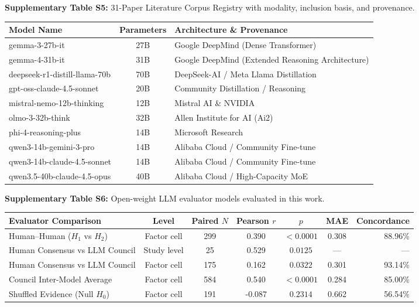 \documentclass[12pt]{article}
\begin{document}
\endgroup
\vspace{0.4em}

\noindent\textbf{Supplementary Table S5:} 31-Paper Literature Corpus Registry with modality, inclusion basis, and provenance.

\newpage

\begingroup
\small
\noindent\begin{tabularx}{\textwidth}{@{}l c >{\raggedright\arraybackslash}X@{}}
\toprule
\textbf{Model Name} & \textbf{Parameters} & \textbf{Architecture \& Provenance} \\
\midrule
gemma-3-27b-it & 27B & Google DeepMind (Dense Transformer) \\
gemma-4-31b-it & 31B & Google DeepMind (Extended Reasoning Architecture) \\
deepseek-r1-distill-llama-70b & 70B & DeepSeek-AI / Meta Llama Distillation \\
gpt-oss-claude-4.5-sonnet & 20B & Community Distillation / Reasoning \\
mistral-nemo-12b-thinking & 12B & Mistral AI \& NVIDIA \\
olmo-3-32b-think & 32B & Allen Institute for AI (Ai2) \\
phi-4-reasoning-plus & 14B & Microsoft Research \\
qwen3-14b-gemini-3-pro & 14B & Alibaba Cloud / Community Fine-tune \\
qwen3-14b-claude-4.5-sonnet & 14B & Alibaba Cloud / Community Fine-tune \\
qwen3.5-40b-claude-4.5-opus & 40B & Alibaba Cloud / High-Capacity MoE \\
\bottomrule
\end{tabularx}
\endgroup
\vspace{0.4em}

\noindent\textbf{Supplementary Table S6:} Open-weight LLM evaluator models evaluated in this work.

\vspace{1.5em}

\begingroup
\small
\setlength{\tabcolsep}{3.5pt}
\begin{center}
\begin{tabular}{@{}l c c c c c r@{}}
\toprule
\textbf{Evaluator Comparison} & \textbf{Level} & \textbf{Paired $N$} & \textbf{Pearson $r$} & \textbf{$p$} & \textbf{MAE} & \textbf{Concordance} \\
\midrule
Human--Human ($H_1$ vs $H_2$) & Factor cell & 299 & 0.390 & $<0.0001$ & 0.308 & 88.96\% \\
Human Consensus vs LLM Council & Study level & 25 & 0.529 & $0.0125$ & --- & --- \\
Human Consensus vs LLM Council & Factor cell & 175 & 0.162 & $0.0322$ & 0.301 & 93.14\% \\
Council Inter-Model Average & Factor cell & 584 & 0.540 & $<0.0001$ & 0.284 & 85.00\% \\
Shuffled Evidence (Null $H_0$) & Factor cell & 191 & -0.087 & $0.2314$ & 0.662 & 56.54\% \\
\bottomrule
\end{tabular}
\end{center}
\endgroup
\vspace{0.4em}
\end{document}
